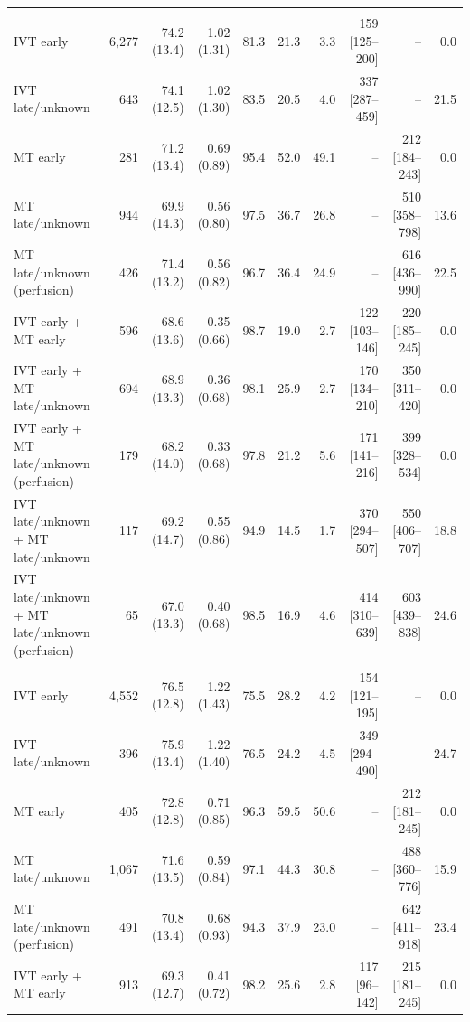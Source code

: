 \begin{landscape}
\begin{longtable}{p{5.6cm}rrrrrrrrr}
\addlinespace
\multicolumn{10}{l}{\textbf{NIHSS 11--15}}\\
IVT early & 6,277 & 74.2 (13.4) & 1.02 (1.31) & 81.3 & 21.3 & 3.3 & 159 [125--200] & -- & 0.0 \\
IVT late/unknown & 643 & 74.1 (12.5) & 1.02 (1.30) & 83.5 & 20.5 & 4.0 & 337 [287--459] & -- & 21.5 \\
MT early & 281 & 71.2 (13.4) & 0.69 (0.89) & 95.4 & 52.0 & 49.1 & -- & 212 [184--243] & 0.0 \\
MT late/unknown & 944 & 69.9 (14.3) & 0.56 (0.80) & 97.5 & 36.7 & 26.8 & -- & 510 [358--798] & 13.6 \\
MT late/unknown (perfusion) & 426 & 71.4 (13.2) & 0.56 (0.82) & 96.7 & 36.4 & 24.9 & -- & 616 [436--990] & 22.5 \\
IVT early + MT early & 596 & 68.6 (13.6) & 0.35 (0.66) & 98.7 & 19.0 & 2.7 & 122 [103--146] & 220 [185--245] & 0.0 \\
IVT early + MT late/unknown & 694 & 68.9 (13.3) & 0.36 (0.68) & 98.1 & 25.9 & 2.7 & 170 [134--210] & 350 [311--420] & 0.0 \\
IVT early + MT late/unknown (perfusion) & 179 & 68.2 (14.0) & 0.33 (0.68) & 97.8 & 21.2 & 5.6 & 171 [141--216] & 399 [328--534] & 0.0 \\
IVT late/unknown + MT late/unknown & 117 & 69.2 (14.7) & 0.55 (0.86) & 94.9 & 14.5 & 1.7 & 370 [294--507] & 550 [406--707] & 18.8 \\
IVT late/unknown + MT late/unknown (perfusion) & 65 & 67.0 (13.3) & 0.40 (0.68) & 98.5 & 16.9 & 4.6 & 414 [310--639] & 603 [439--838] & 24.6 \\
\addlinespace
\multicolumn{10}{l}{\textbf{NIHSS 16--20}}\\
IVT early & 4,552 & 76.5 (12.8) & 1.22 (1.43) & 75.5 & 28.2 & 4.2 & 154 [121--195] & -- & 0.0 \\
IVT late/unknown & 396 & 75.9 (13.4) & 1.22 (1.40) & 76.5 & 24.2 & 4.5 & 349 [294--490] & -- & 24.7 \\
MT early & 405 & 72.8 (12.8) & 0.71 (0.85) & 96.3 & 59.5 & 50.6 & -- & 212 [181--245] & 0.0 \\
MT late/unknown & 1,067 & 71.6 (13.5) & 0.59 (0.84) & 97.1 & 44.3 & 30.8 & -- & 488 [360--776] & 15.9 \\
MT late/unknown (perfusion) & 491 & 70.8 (13.4) & 0.68 (0.93) & 94.3 & 37.9 & 23.0 & -- & 642 [411--918] & 23.4 \\
IVT early + MT early & 913 & 69.3 (12.7) & 0.41 (0.72) & 98.2 & 25.6 & 2.8 & 117 [96--142] & 215 [181--245] & 0.0 \\

\end{longtable}
\end{landscape}
